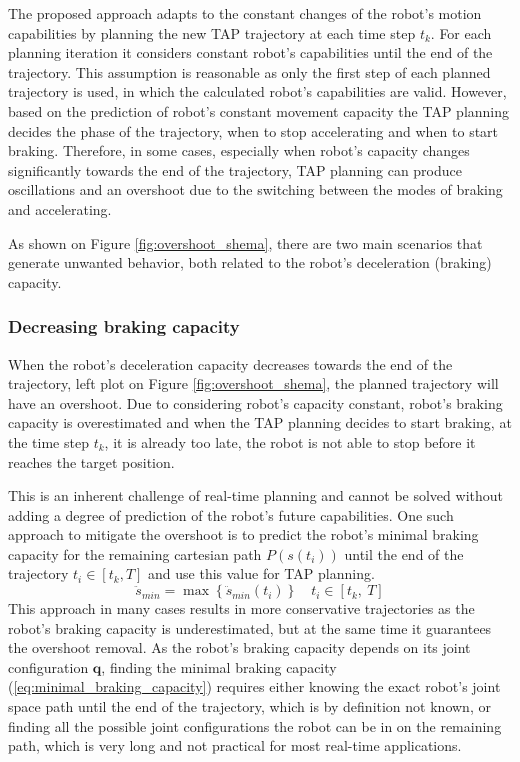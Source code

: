 The proposed approach adapts to the constant changes of the robot's motion capabilities by planning the new TAP trajectory at each time step $t_k$. For each planning iteration it considers constant robot's capabilities until the end of the trajectory. This assumption is reasonable as only the first step of each planned trajectory is used, in which the calculated robot's capabilities are valid. 
However, based on the prediction of robot's constant movement capacity the TAP planning decides the phase of the trajectory, when to stop accelerating and when to start braking. Therefore, in some cases, especially when robot's capacity changes significantly towards the end of the trajectory, TAP planning can produce oscillations and an overshoot due to the switching between the modes of braking and accelerating.

As shown on Figure \ref{fig:overshoot_shema}, there are two main scenarios that generate unwanted behavior, both related to the robot's deceleration (braking) capacity. 

\subsubsection{Decreasing braking capacity} When the robot's deceleration capacity decreases towards the end of the trajectory, left plot on Figure \ref{fig:overshoot_shema}, the planned trajectory will have an overshoot. Due to considering robot's capacity constant, robot's braking capacity is overestimated and when the TAP planning decides to start braking, at the time step $t_k$, it is already too late, the robot is not able to stop before it reaches the target position. 

This is an inherent challenge of real-time planning and cannot be solved without adding a degree of prediction of the robot's future capabilities. One such approach to mitigate the overshoot is to predict the robot's minimal braking capacity for the remaining cartesian path $P\left(s(t_i)\right)$ until the end of the trajectory $ t_i \in \left[t_k, T\right]$ and use this value for TAP planning.
\begin{equation}
    \ddot{s}_{min} = \max \left\{\ddot{s}_{min}(t_i)\right\} \quad t_i \in \left[t_k ,~ T\right]
\label{eq:minimal_braking_capacity}
\end{equation}
This approach in many cases results in more conservative trajectories as the robot's braking capacity is underestimated, but at the same time it guarantees the overshoot removal. As the robot's braking capacity depends on its joint configuration $\bm{q}$, finding the minimal braking capacity (\ref{eq:minimal_braking_capacity}) requires either knowing the exact robot's joint space path until the end of the trajectory, which is by definition not known, or finding all the possible joint configurations the robot can be in on the remaining path, which is very long and not practical for most real-time applications.

